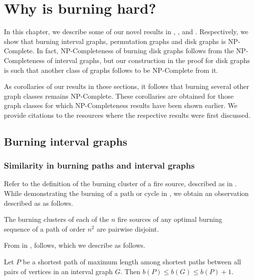 \chapter{Why is burning hard?}\label{chapter:why-hard}

In this chapter, we describe some of our novel results in , , and . Respectively, we show that burning interval graphs, permutation graphs and disk graphs is NP-Complete. In fact, NP-Completeness of burning disk graphs follows from the NP-Completeness of interval graphs, but our construction in the proof for disk graphs is such that another class of graphs follows to be NP-Complete from it.

As corollaries of our results in these sections, it follows that burning several other graph classes remains NP-Complete. These corollaries are obtained for those graph classes for which NP-Completeness results have been shown earlier. We provide citations to the resources where the respective results were first discussed.

\section{Burning interval graphs}\label{section:burn-interval-graphs}

\subsection{Similarity in burning paths and interval graphs}\label{subsection:similar-burn-path-IG}

Refer to the definition of the burning cluster of a fire source, described as  in . While demonstrating the burning of a path or cycle in , we obtain an observation described as  as follows.

\begin{observation}\label{observation:path}
The burning clusters of each of the $n$ fire sources of any optimal burning sequence of a path of order $n^2$ are pairwise disjoint.
\end{observation}

From  in ,  follows, which we describe as follows.

\begin{observation}\label{observation:bound}
Let $P$ be a shortest path of maximum length among shortest paths between all pairs of vertices in an interval graph $G$. Then $b(P) \leq b(G) \leq b(P)+1$.
\end{observation}


